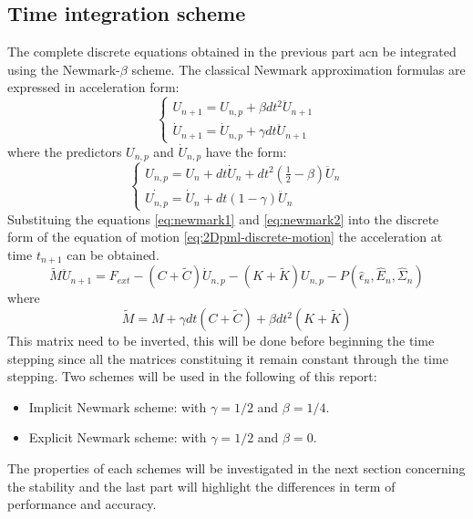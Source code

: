 \subsection{Time integration scheme}
The complete discrete equations obtained in the previous part acn be integrated using the Newmark-$\beta$ scheme. The classical Newmark approximation formulas are expressed in acceleration form:
\begin{equation}
\begin{cases}
U_{n+1} = U_{n,p} + \beta dt^2 \ddot{U}_{n+1} \\
\dot{U}_{n+1} = \dot{U}_{n,p} + \gamma dt \ddot{U}_{n+1}
\end{cases}
\label{eq:newmark1}
\end{equation}
where the predictors $U_{n,p}$ and $\dot{U}_{n,p}$ have the form:
\begin{equation}
\begin{cases}
U_{n,p} = U_n + dt \dot{U}_n + dt^2 \left(\frac{1}{2} -\beta  \right)\ddot{U}_n \\
\dot{U_{n,p}} = \dot{U}_n + dt (1-\gamma)\ddot{U}_n
\end{cases}
\label{eq:newmark2}
\end{equation}
Substituing the equations \ref{eq:newmark1} and \ref{eq:newmark2} into the discrete form of the equation of motion \ref{eq:2Dpml-discrete-motion} the acceleration at time $t_{n+1}$ can be obtained.
\begin{equation}
\tilde{M}\ddot{U}_{n+1} = F_{ext} - \left(C+\tilde{C}\right)\dot{U}_{n,p} - \left(K+\tilde{K}\right)U_{n,p} - P(\hat{\epsilon}_n,\hat{E}_n,\hat{\Sigma}_n)
\end{equation}
where 
\begin{equation}
\tilde{M} = M + \gamma dt \left(C+\tilde{C}\right) + \beta dt^2 \left(K+\tilde{K}\right)
\end{equation}
This matrix need to be inverted, this will be done before beginning the time stepping since all the matrices constituing it remain constant through the time stepping. Two schemes will be used in the following of this report:
\begin{itemize}
\item Implicit Newmark scheme: with $\gamma = 1/2$ and $\beta = 1/4$.
\item Explicit Newmark scheme: with $\gamma = 1/2$ and $\beta = 0$.
\end{itemize} 
The properties of each schemes will be investigated in the next section concerning the stability and the last part will highlight the differences in term of performance and accuracy.









 





